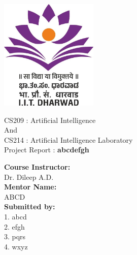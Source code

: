 \documentclass[a4paper,12pt]{article}
\begin{document}
\begin{titlepage}
    \centering
    \vspace*{1.7cm}
    
    \Huge
    \centering
     \\
    \vspace{0.5cm}
    
    \centering
    \includegraphics[width=0.35\textwidth]{img.png} %
    
    \vspace{1cm}
    \LARGE  
    \centering
    CS209 : Artificial Intelligence\\
                    And\\
    CS214 : Artificial Intelligence Laboratory\\

    Project Report :\textbf{ abcdefgh} \\
    
    \vspace{1.5cm}
    
    \textbf{Course Instructor:}\\
    Dr. Dileep A.D.\\
    
    \vfill
    \textbf{Mentor Name:}\\
    ABCD\\
    
    \Large
    \textbf{Submitted by:} \\
    1. abcd \\
    2. efgh\\
    3. pqrs\\
    4. wxyz
    
\end{titlepage}

\newpage
\tableofcontents

\newpage
\listoffigures
\end{document}
